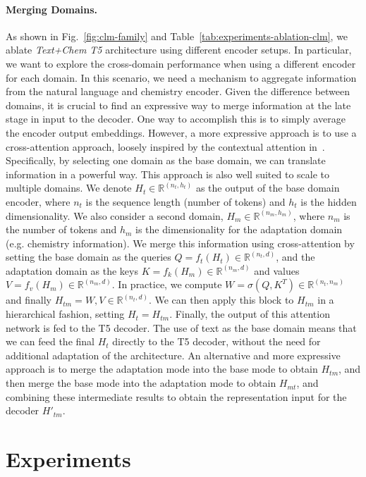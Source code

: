 \documentclass[nohyperref]{article}
\newcommand{\bR}{\mathbb{R}}
\theoremstyle{plain}
\theoremstyle{definition}
\theoremstyle{remark}
\begin{document}
\paragraph{Merging Domains.}
As shown in Fig.~\ref{fig:clm-family} and Table~\ref{tab:experiments-ablation-clm}, we ablate \emph{Text+Chem T5}  architecture using different encoder setups. In particular, we want to explore the cross-domain performance when using a different encoder for each domain. In this scenario, we need a mechanism to aggregate information from the natural language and chemistry encoder. 
Given the difference between domains, it is crucial to find an expressive way to merge information at the late stage in input to the decoder.
One way to accomplish this is to simply average the encoder output embeddings.
However, a more expressive approach is to use a cross-attention approach, loosely inspired by the contextual attention in~\citet{born2021data}. Specifically, by selecting one domain as the base domain, we can translate information in a powerful way. This approach is also well suited to scale to multiple domains.
We denote $H_t \in \bR^{(n_t, h_t)}$ as the output of the base domain encoder, where $n_t$ is the sequence length (number of tokens) and $h_t$ is the hidden dimensionality. We also consider a second domain, $H_m \in \bR^{(n_m, h_m)}$, where $n_m$ is the number of tokens and $h_m$ is the dimensionality for the adaptation domain (e.g. chemistry information).
We merge this information using cross-attention by setting the base domain as the queries 
$Q = f_t(H_t) \in \bR^{(n_t, d)}$, and the adaptation domain as the keys 
$K = f_k(H_m) \in \bR^{(n_m, d)}$ and values $V = f_v(H_m) \in \bR^{(n_m, d)}$.
In practice, we compute $W = \sigma(Q, K^T) \in \bR^{(n_t, n_m)}$ and finally $H_{tm} = W,V \in \bR^{(n_t, d)}$.
We can then apply this block to $H_{tm}$ in a hierarchical fashion, setting $H_t = H_{tm}$. Finally, the output of this attention network is fed to the T5 decoder. The use of text as the base domain means that we can feed the final $H_t$ directly to the T5 decoder, without the need for additional adaptation of the architecture.
An alternative and more expressive approach is to merge the adaptation mode into the base mode to obtain $H_{tm}$, and then merge the base mode into the adaptation mode to obtain $H_{mt}$, and combining these intermediate results to obtain the representation input for the decoder $H'_{tm}$. 
 \section{Experiments}
\label{section:experiment}
\end{document}
